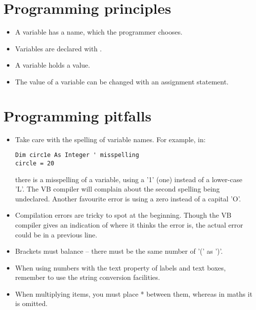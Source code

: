 	\section{Programming principles}
		\begin{itemize}
			\item A variable has a name, which the programmer chooses.
			\item Variables are declared with .
			\item A variable holds a value.
			\item The value of a variable can be changed with an assignment statement.
		\end{itemize}

	\section{Programming pitfalls}
		\begin{itemize}
			\item Take care with the spelling of variable names. For example, in:
				\begin{lstlisting}
Dim circ1e As Integer ' misspelling
circle = 20
				\end{lstlisting}
				there is a misspelling of a variable, using a '1' (one) instead of a lower-case 'L'. The VB compiler will complain about the second spelling being undeclared. Another favourite error is using a zero instead of a capital 'O'.
			\item Compilation errors are tricky to spot at the beginning. Though the VB compiler gives an indication of where it thinks the error is, the actual error could be in a previous line.
			\item Brackets must balance – there must be the same number of '(' as ')'.
			\item When using numbers with the text property of labels and text boxes, remember to use the string conversion facilities.
			\item When multiplying items, you must place * between them, whereas in maths it is omitted.
		\end{itemize}
	
